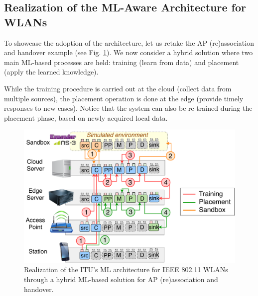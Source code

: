 \documentclass{article}
\begin{document}
\subsection{Realization of the ML-Aware Architecture for WLANs}

To showcase the adoption of the architecture, let us retake the AP (re)association and handover example (see Fig. \ref{fig:ml_architecture_wlan}). We now consider a hybrid solution where two main ML-based processes are held: training (learn from data) and placement (apply the learned knowledge). 

While the training procedure is carried out at the cloud (collect data from multiple sources), the placement operation is done at the edge (provide timely responses to new cases). Notice that the system can also be re-trained during the placement phase, based on newly acquired local data.

\begin{figure}[ht!]
	\includegraphics[width=.85\columnwidth]{ml_architecture_wlan_2}
	\caption{Realization of the ITU's ML architecture for IEEE 802.11 WLANs through a hybrid ML-based solution for AP (re)association and handover.}
	\label{fig:ml_architecture_wlan}
\end{figure}
\end{document}
